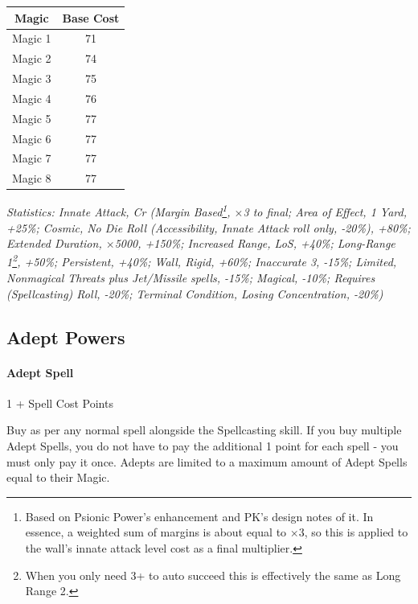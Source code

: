 \begin{multicols*}{3}
	\begin{center}
		\begin{tabular}{|c|c|}
			\hline
			Magic & Base Cost \\
			\hline
			\hline
			Magic 1 & 71 \\
			Magic 2 & 74 \\
			Magic 3 & 75 \\
			Magic 4 & 76 \\
			Magic 5 & 77 \\
			Magic 6 & 77 \\
			Magic 7 & 77 \\
			Magic 8 & 77 \\
			\hline
		\end{tabular}
	\end{center}
	
	\textcolor{OliveGreen}{\textit{Statistics: Innate Attack, Cr (Margin Based\footnote{Based on Psionic Power's enhancement and PK's design notes of it. In essence, a weighted sum of margins is about equal to $\times$3, so this is applied to the wall's innate attack level cost as a final multiplier.}, $\times$3 to final; Area of Effect, 1 Yard, +25\%; Cosmic, No Die Roll (Accessibility, Innate Attack roll only, -20\%), +80\%; Extended Duration, $\times$5000, +150\%; Increased Range, LoS, +40\%; Long-Range 1\footnote{When you only need 3+ to auto succeed this is effectively the same as Long Range 2.}, +50\%; Persistent, +40\%; Wall, Rigid, +60\%; Inaccurate 3, -15\%; Limited, Nonmagical Threats plus Jet/Missile spells, -15\%; Magical, -10\%; Requires (Spellcasting) Roll, -20\%; Terminal Condition, Losing Concentration, -20\%)}}

	\subsection{Adept Powers}
	
	\paragraph{Adept Spell}
	\begin{flushright}
		1 + Spell Cost Points
	\end{flushright}
	
	Buy as per any normal spell alongside the Spellcasting skill. If you buy multiple Adept Spells, you do not have to pay the additional 1 point for each spell - you must only pay it once. Adepts are limited to a maximum amount of Adept Spells equal to their Magic.
	

\end{multicols*}

